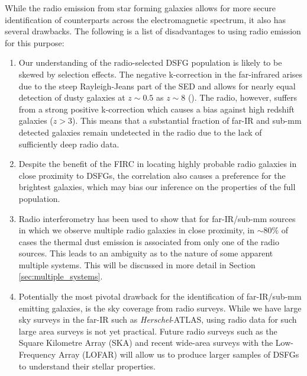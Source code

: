 While the radio emission from star forming galaxies allows for more secure identification of counterparts across the electromagnetic spectrum, it also has several drawbacks. The following is a list of disadvantages to using radio emission for this purpose:

\begin{enumerate}
    \item Our understanding of the radio-selected DSFG population is likely to be skewed by selection effects. The negative k-correction in the far-infrared arises due to the steep Rayleigh-Jeans part of the SED and allows for nearly equal detection of dusty galaxies at $z \sim 0.5$ as $z \sim 8$ (\citealt{Blain_2002}). The radio, however, suffers from a strong positive k-correction which causes a bias against high redshift galaxies ($z > 3$). This means that a substantial fraction of far-IR and sub-mm detected galaxies remain undetected in the radio due to the lack of sufficiently deep radio data.
    \item Despite the benefit of the FIRC in locating highly probable radio galaxies in close proximity to DSFGs, the correlation also causes a preference for the brightest galaxies, which may bias our inference on the properties of the full population.
    \item Radio interferometry has been used to show that for far-IR/sub-mm sources in which we observe multiple radio galaxies in close proximity, in $\sim 80\%$ of cases the thermal dust emission is associated from only one of the radio sources. This leads to an ambiguity as to the nature of some apparent multiple systems. This will be discussed in more detail in Section \ref{sec:multiple_systems}.
    \item Potentially the most pivotal drawback for the identification of far-IR/sub-mm emitting galaxies, is the sky coverage from radio surveys. While we have large sky surveys in the far-IR such as \textit{Herschel}-ATLAS, using radio data for such large area surveys is not yet practical. Future radio surveys such as the Square Kilometre Array (SKA) and recent wide-area surveys with the Low-Frequency Array (LOFAR) will allow us to produce larger samples of DSFGs to understand their stellar properties.
\end{enumerate}

